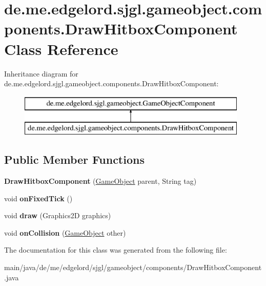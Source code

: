\hypertarget{classde_1_1me_1_1edgelord_1_1sjgl_1_1gameobject_1_1components_1_1_draw_hitbox_component}{}\section{de.\+me.\+edgelord.\+sjgl.\+gameobject.\+components.\+Draw\+Hitbox\+Component Class Reference}
\label{classde_1_1me_1_1edgelord_1_1sjgl_1_1gameobject_1_1components_1_1_draw_hitbox_component}
Inheritance diagram for de.\+me.\+edgelord.\+sjgl.\+gameobject.\+components.\+Draw\+Hitbox\+Component\+:\begin{figure}[H]
\begin{center}
\leavevmode
\includegraphics[height=2.000000cm]{classde_1_1me_1_1edgelord_1_1sjgl_1_1gameobject_1_1components_1_1_draw_hitbox_component}
\end{center}
\end{figure}
\subsection*{Public Member Functions}
\begin{DoxyCompactItemize}
\item 
\mbox{\label{classde_1_1me_1_1edgelord_1_1sjgl_1_1gameobject_1_1components_1_1_draw_hitbox_component_aa709a1a7941030928d5e21eeb1356e79}} 
{\bfseries Draw\+Hitbox\+Component} (\mbox{\hyperlink{classde_1_1me_1_1edgelord_1_1sjgl_1_1gameobject_1_1_game_object}{Game\+Object}} parent, String tag)
\item 
\mbox{\label{classde_1_1me_1_1edgelord_1_1sjgl_1_1gameobject_1_1components_1_1_draw_hitbox_component_ac68355bdf8c4b4b0fb68c6d3daf8d77b}} 
void {\bfseries on\+Fixed\+Tick} ()
\item 
\mbox{\label{classde_1_1me_1_1edgelord_1_1sjgl_1_1gameobject_1_1components_1_1_draw_hitbox_component_adf05b49a0271518e1d9601cfe08cc99b}} 
void {\bfseries draw} (Graphics2D graphics)
\item 
\mbox{\label{classde_1_1me_1_1edgelord_1_1sjgl_1_1gameobject_1_1components_1_1_draw_hitbox_component_a76114ecfa0b9badbb0d7c77b90999682}} 
void {\bfseries on\+Collision} (\mbox{\hyperlink{classde_1_1me_1_1edgelord_1_1sjgl_1_1gameobject_1_1_game_object}{Game\+Object}} other)
\end{DoxyCompactItemize}


The documentation for this class was generated from the following file\+:\begin{DoxyCompactItemize}
\item 
main/java/de/me/edgelord/sjgl/gameobject/components/Draw\+Hitbox\+Component.\+java\end{DoxyCompactItemize}
